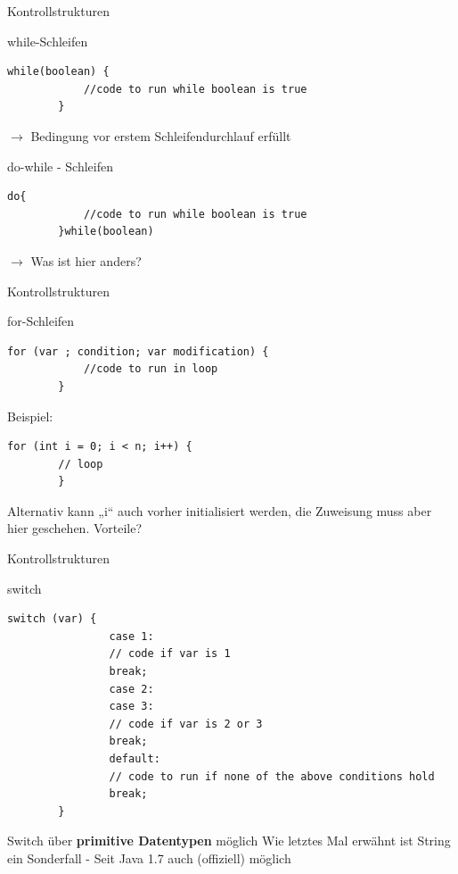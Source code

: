 \documentclass[18pt]{beamer}
\begin{document}
\begin{frame}[fragile]{Kontrollstrukturen}
\begin{exampleblock}{while-Schleifen}
	\begin{lstlisting}[basicstyle=\scriptsize]
		while(boolean) {
			//code to run while boolean is true
		}
	\end{lstlisting}
\begin{center}
$\to$ Bedingung vor erstem Schleifendurchlauf erfüllt
\end{center}
\end{exampleblock}

\begin{exampleblock}{do-while - Schleifen}
	\begin{lstlisting}[basicstyle=\scriptsize]
		do{
			//code to run while boolean is true
		}while(boolean) 
	\end{lstlisting}
\begin{center}
$\to$ Was ist hier anders?
\end{center}
\end{exampleblock}
\end{frame}

\begin{frame}[fragile]{Kontrollstrukturen}
\begin{exampleblock}{for-Schleifen}
	\begin{lstlisting}[basicstyle=\scriptsize]
		for (var ; condition; var modification) {
			//code to run in loop
		}
	\end{lstlisting}
\end{exampleblock}

\begin{exampleblock}{Beispiel:}
	\begin{lstlisting}[basicstyle=\scriptsize]
		for (int i = 0; i < n; i++) {
		// loop
		}
	\end{lstlisting}
\begin{center}
Alternativ kann „i“ auch vorher initialisiert werden, die Zuweisung muss
aber hier geschehen. Vorteile?
\end{center}
\end{exampleblock}
\end{frame}


\begin{frame}[fragile]{Kontrollstrukturen}
\begin{exampleblock}{switch}
	\begin{lstlisting}[basicstyle=\scriptsize]
		switch (var) {
				case 1:
				// code if var is 1
				break;
				case 2:
				case 3:
				// code if var is 2 or 3
				break;
				default:
				// code to run if none of the above conditions hold
				break;
		}
	\end{lstlisting}
\end{exampleblock}
\begin{center}
Switch über \textbf{primitive Datentypen} möglich \newline
\small{Wie letztes Mal erwähnt ist String ein Sonderfall - Seit Java 1.7 auch (offiziell) möglich}
\end{center}
\end{frame}
\end{document}
